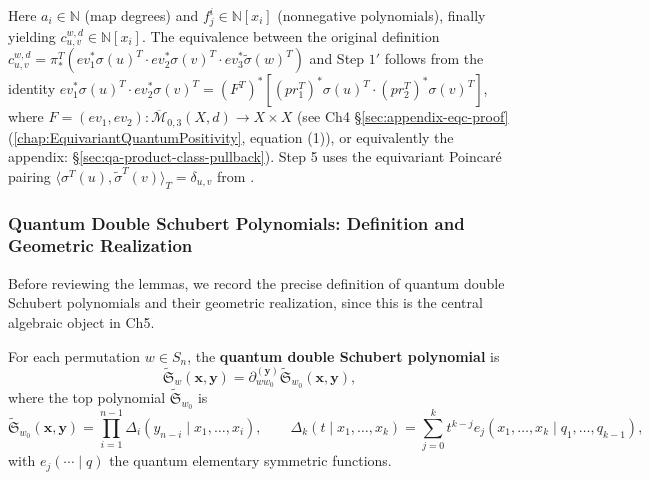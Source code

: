Here $a_i \in \mathbb{N}$ (map degrees) and $f_j^i \in \mathbb{N}[x_i]$ (nonnegative polynomials), finally yielding $c_{u,v}^{w,d} \in \mathbb{N}[x_i]$. The equivalence between the original definition $c_{u,v}^{w,d} = \pi_*^T(ev_1^*\sigma(u)^T \cdot ev_2^*\sigma(v)^T \cdot ev_3^*\widetilde{\sigma}(w)^T)$ and Step $1'$ follows from the identity $ev_1^*\sigma(u)^T \cdot ev_2^*\sigma(v)^T = (F^T)^*[(pr_1^T)^*\sigma(u)^T \cdot (pr_2^T)^*\sigma(v)^T]$, where $F = (ev_1, ev_2): \overline{\mathcal{M}}_{0,3}(X,d) \to X \times X$ (see Ch4 \S\cref{sec:appendix-eqc-proof} (\cref{chap:EquivariantQuantumPositivity}, equation (1)), or equivalently the appendix: \S\cref{sec:qa-product-class-pullback}). Step 5 uses the equivariant Poincar\'e pairing $\langle\sigma^T(u),\widetilde{\sigma}^T(v)\rangle_T = \delta_{u,v}$ from \cite[Proposition 3.1]{Mihalcea}.

\subsubsection{Quantum Double Schubert Polynomials: Definition and Geometric Realization}
\label{sec:QuantumDoubleDefInCh5}

Before reviewing the lemmas, we record the precise definition of quantum double Schubert polynomials and their geometric realization, since this is the central algebraic object in Ch5.

\begin{Definition}
\label{def:QuantumDoubleSchubertCh5}
For each permutation $w \in S_n$, the \textbf{quantum double Schubert polynomial} is
\[
\widetilde{\mathfrak{S}}_w(\mathbf{x}, \mathbf{y}) = \partial_{ww_0}^{(\mathbf{y})} \widetilde{\mathfrak{S}}_{w_0}(\mathbf{x}, \mathbf{y}),
\]
where the top polynomial $\widetilde{\mathfrak{S}}_{w_0}$ is
\[
\widetilde{\mathfrak{S}}_{w_0}(\mathbf{x}, \mathbf{y}) = \prod_{i=1}^{n-1} \Delta_i(y_{n-i} \mid x_1, \ldots, x_i),
\qquad
\Delta_k(t \mid x_1, \ldots, x_k) = \sum_{j=0}^k t^{k-j} e_j(x_1,\ldots,x_k \mid q_1,\ldots,q_{k-1}),
\]
with $e_j(\cdots \mid q)$ the quantum elementary symmetric functions.
\end{Definition}


